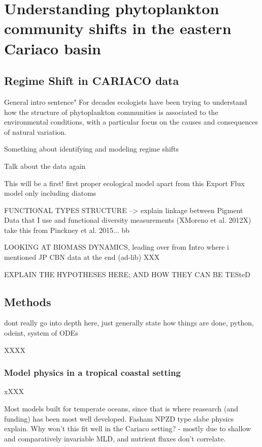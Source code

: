 \chapter{Understanding phytoplankton community shifts in the eastern Cariaco basin}

\small {\textbf{}}


\normalsize
\section{Regime Shift in CARIACO data}
General intro sentence" For decades ecologists have been trying to understand how the structure of phytoplankton communities is associated to the environmental conditions, with a particular focus on the causes and consequences of natural variation.

Something about identifying and modeling regime shifts

Talk about the data again

This will be a first! first proper ecological model apart from this Export Flux model only including diatoms \citep{Walsh2002a}


FUNCTIONAL TYPES STRUCTURE --> explain linkage between Pigment Data that I use and functional diversity measurements (XMoreno et al. 2012X) take this from Pinckney et al. 2015...
bb


LOOKING AT BIOMASS DYNAMICS, leading over from Intro where i mentioned JP CBN data at the end (ad-lib)
XXX

EXPLAIN THE HYPOTHESES HERE; AND HOW THEY CAN BE TESteD

\section{Methods}


dont really go into depth here, just generally state how things are done, python, odeint, system of ODEs

XXXX

\subsection{Model physics in a tropical coastal setting}
xXXX

Most models built for temperate oceans, since that is where reasearch (and funding) has been most well developed. Fasham NPZD type slabe physics explain.
Why won't this fit well in the Cariaco setting? - mostly due to shallow and comparatively invariable MLD, and nutrient fluxes don't correlate.

